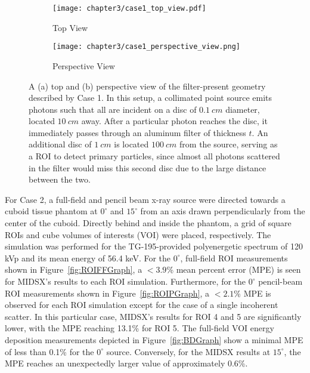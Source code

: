 \begin{figure}[H]
    \centering
    \begin{subfigure}[l]{\textwidth}
        \texttt{[image: chapter3/case1\_top\_view.pdf]}
        \caption{Top View}
    \end{subfigure}
    \hfill %
    \begin{subfigure}[l]{\textwidth}
        \texttt{[image: chapter3/case1\_perspective\_view.png]}
        \caption{Perspective View}
    \end{subfigure}
    \caption{A (a) top and (b) perspective view of the filter-present geometry described by Case 1. In this setup, a collimated point source emits photons such that all are incident on a disc of $\qty{0.1}{cm}$ diameter, located $\qty{10}{cm}$ away. After a particular photon reaches the disc, it immediately passes through an aluminum filter of thickness $t$. An additional disc of $\qty{1}{cm}$ is located $\qty{100}{cm}$ from the source, serving as a ROI to detect primary particles, since almost all photons scattered in the filter would miss this second disc due to the large distance between the two.}
    \label{fig:case1}
\end{figure}

\par For Case 2, a full-field and pencil beam x-ray source were directed towards a cuboid tissue phantom at $0^\circ$ and $15^\circ$ from an axis drawn perpendicularly from the center of the cuboid. Directly behind and inside the phantom, a grid of square ROIs and cube volumes of interests (VOI) were placed, respectively. The simulation was performed for the TG-195-provided polyenergetic spectrum of 120 kVp and its mean energy of 56.4 keV. For the $0^\circ$, full-field ROI measurements shown in Figure~\ref{fig:ROIFFGraph}, a $<3.9$\% mean percent error (MPE) is seen for MIDSX's results to each ROI simulation. Furthermore, for the $0^\circ$ pencil-beam ROI measurements shown in Figure~\ref{fig:ROIPGraph}, a $<2.1$\% MPE is observed for each ROI simulation except for the case of a single incoherent scatter. In this particular case, MIDSX's results for ROI 4 and 5 are significantly lower, with the MPE reaching 13.1\% for ROI 5. The full-field VOI energy deposition measurements depicted in Figure~\ref{fig:BDGraph} show a minimal MPE of less than 0.1\% for the $0^\circ$ source. Conversely, for the MIDSX results at $15^\circ$, the MPE reaches an unexpectedly larger value of approximately 0.6\%.

